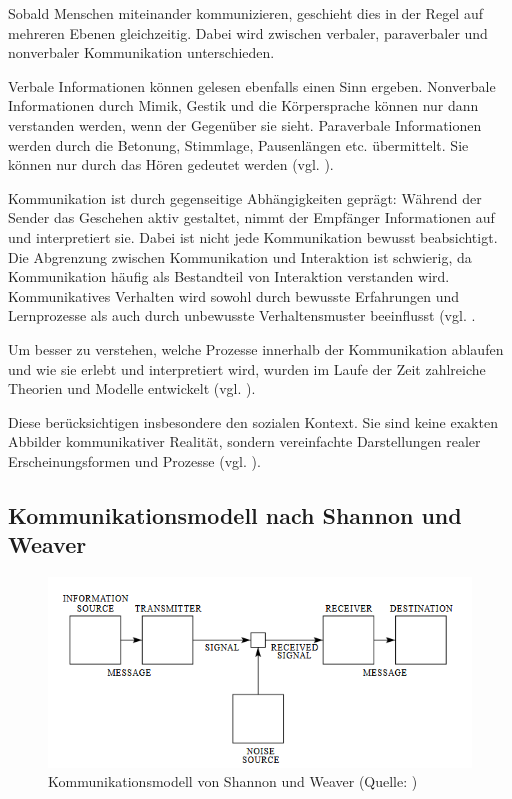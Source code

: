Sobald Menschen miteinander kommunizieren, geschieht dies in der Regel auf mehreren Ebenen gleichzeitig. Dabei wird zwischen verbaler, paraverbaler und nonverbaler Kommunikation unterschieden. 

Verbale Informationen können gelesen ebenfalls einen Sinn ergeben.
Nonverbale Informationen durch Mimik, Gestik und die Körpersprache können nur dann verstanden werden, wenn der Gegenüber sie sieht. 
Paraverbale Informationen werden durch die Betonung, Stimmlage, Pausenlängen etc. übermittelt. Sie können nur durch das Hören gedeutet werden (vgl. \citealp[S. 33]{ebert_formen_2018}).

Kommunikation ist durch gegenseitige Abhängigkeiten geprägt: Während der Sender das Geschehen aktiv gestaltet, nimmt der Empfänger Informationen auf und interpretiert sie. Dabei ist nicht jede Kommunikation bewusst beabsichtigt. Die Abgrenzung zwischen Kommunikation und Interaktion ist schwierig, da Kommunikation häufig als Bestandteil von Interaktion verstanden wird. Kommunikatives Verhalten wird sowohl durch bewusste Erfahrungen und Lernprozesse als auch durch unbewusste Verhaltensmuster beeinflusst (vgl. \citealp[S. 20]{becker_praxishandbuch_2018}.

Um besser zu verstehen, welche Prozesse innerhalb der Kommunikation ablaufen und wie sie erlebt und interpretiert wird, wurden im Laufe der Zeit zahlreiche Theorien und Modelle entwickelt (vgl. \citealp[S. 311]{schwarz_grundlagen_2019}).

Diese  berücksichtigen insbesondere den sozialen Kontext. Sie sind keine exakten Abbilder kommunikativer Realität, sondern vereinfachte Darstellungen realer Erscheinungsformen und Prozesse (vgl. \citealp[S. 56]{maletzke_kommunikationswissenschaft_1998}).

\subsection{Kommunikationsmodell nach Shannon und Weaver}

\begin{figure}[ht]
\centering
\includegraphics[width=1\linewidth]{content/pictures/shannon-weaver.PNG}
\caption{Kommunikationsmodell von Shannon und Weaver (Quelle: \citealp[S. 2]{shannon_mathematical_1948})}
\label{fig:shannon-weaver-modell}
\end{figure}

